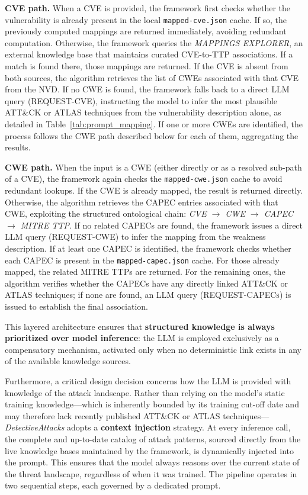 \documentclass[conference]{IEEEtran}
\begin{document}
\textbf{CVE path.}
When a CVE is provided, the framework first checks whether the vulnerability is already present in the local \texttt{mapped-cve.json} cache. If so, the previously computed mappings are returned immediately, avoiding redundant computation. Otherwise, the framework queries the \textit{MAPPINGS EXPLORER}, an external knowledge base that maintains curated CVE-to-TTP associations. If a match is found there, those mappings are returned. If the CVE is absent from both sources, the algorithm retrieves the list of CWEs associated with that CVE from the NVD. If no CWE is found, the framework falls back to a direct LLM query (\textsc{REQUEST-CVE}), instructing the model to infer the most plausible ATT\&CK or ATLAS techniques from the vulnerability description alone, as detailed in Table~\ref{tab:prompt_mapping}. If one or more CWEs are identified, the process follows the CWE path described below for each of them, aggregating the results.

\textbf{CWE path.}
When the input is a CWE (either directly or as a resolved sub-path of a CVE), the framework again checks the \texttt{mapped-cwe.json} cache to avoid redundant lookups. If the CWE is already mapped, the result is returned directly. Otherwise, the algorithm retrieves the CAPEC entries associated with that CWE, exploiting the structured ontological chain: \textit{CVE $\rightarrow$ CWE $\rightarrow$ CAPEC $\rightarrow$ MITRE TTP}. If no related CAPECs are found, the framework issues a direct LLM query (\textsc{REQUEST-CWE}) to infer the mapping from the weakness description. If at least one CAPEC is identified, the framework checks whether each CAPEC is present in the \texttt{mapped-capec.json} cache. For those already mapped, the related MITRE TTPs are returned. For the remaining ones, the algorithm verifies whether the CAPECs have any directly linked ATT\&CK or ATLAS techniques; if none are found, an LLM query (\textsc{REQUEST-CAPECs}) is issued to establish the final association.

This layered architecture ensures that \textbf{structured knowledge is always prioritized over model inference}: the LLM is employed exclusively as a compensatory mechanism, activated only when no deterministic link exists in any of the available knowledge sources.

Furthermore, a critical design decision concerns how the LLM is provided with knowledge of the attack landscape. Rather than relying on the model's static training knowledge—which is inherently bounded by its training cut-off date and may therefore lack recently published ATT\&CK or ATLAS techniques—\textit{DetectiveAttacks} adopts a \textbf{context injection} strategy. 
At every inference call, the complete and up-to-date catalog of attack patterns, sourced directly from the live knowledge bases maintained by the framework, is dynamically injected into the prompt. This ensures that the model always reasons over the current state of the threat landscape, regardless of when it was trained.
The pipeline operates in two sequential steps, each governed by a dedicated prompt. 
\end{document}
